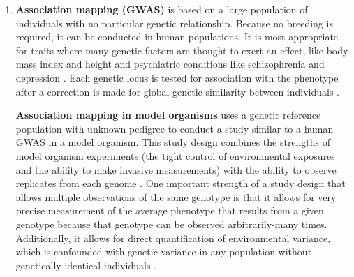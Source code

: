 \begin{enumerate}
	\item \textbf{Association mapping (GWAS)} is based on a large population of individuals with no particular genetic relationship.
	Because no breeding is required, it can be conducted in human populations.
	It is most appropriate for traits where many genetic factors are thought to exert an effect, like body mass index \citep{Speliotes2010,Locke2015} and height \citep{Allen2010,Wood2014-fh} and psychiatric conditions like schizophrenia \citep{Ripke2014a} and depression \citep{PGC2017}.
	Each genetic locus is tested for association with the phenotype after a correction is made for global genetic similarity between individuals \citep{Lippert2011,Zhou2012}.


	\textbf{Association mapping in model organisms} uses a genetic reference population with unknown pedigree to conduct a study similar to a human GWAS in a model organism.
	This study design combines the strengths of model organism experiments (the tight control of environmental exposures and the ability to make invasive measurements) with the ability to observe replicates from each genome \citep{Payseur2007a,Kang2008,Kirby2010a}.
	One important strength of a study design that allows multiple observations of the same genotype is that it allows for very precise measurement of the average phenotype that results from a given genotype because that genotype can be observed arbitrarily-many times.
	Additionally, it allows for direct quantification of environmental variance, which is confounded with genetic variance in any population without genetically-identical individuals \citep{Falconer1965,Lynch1998}.

\end{enumerate}
	

